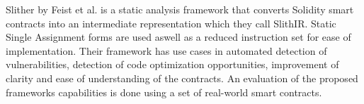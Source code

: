 \documentclass[10pt,conference]{IEEEtran}
\begin{document}
Slither by Feist et al. \cite{slither} is a static analysis framework that converts Solidity smart contracts into an intermediate representation which they call SlithIR. Static Single Assignment forms are used aswell as a reduced instruction set for ease of implementation. Their framework has use cases in automated detection of vulnerabilities, detection of code optimization opportunities, improvement of clarity and ease of understanding of the contracts. An evaluation of the proposed frameworks capabilities is done using a set of real-world smart contracts. 





\end{document}
